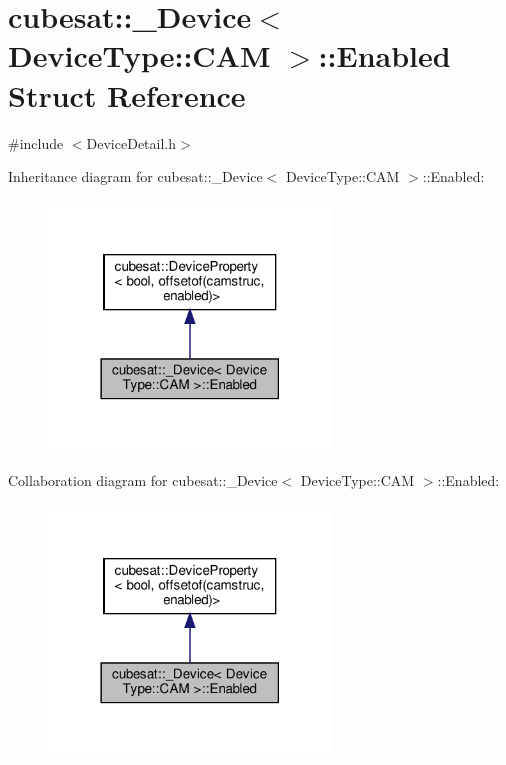 \hypertarget{structcubesat_1_1__Device_3_01DeviceType_1_1CAM_01_4_1_1Enabled}{}\section{cubesat\+:\+:\+\_\+\+Device$<$ Device\+Type\+:\+:C\+AM $>$\+:\+:Enabled Struct Reference}
\label{structcubesat_1_1__Device_3_01DeviceType_1_1CAM_01_4_1_1Enabled}


{\ttfamily \#include $<$Device\+Detail.\+h$>$}



Inheritance diagram for cubesat\+:\+:\+\_\+\+Device$<$ Device\+Type\+:\+:C\+AM $>$\+:\+:Enabled\+:\nopagebreak
\begin{figure}[H]
\begin{center}
\leavevmode
\includegraphics[width=213pt]{structcubesat_1_1__Device_3_01DeviceType_1_1CAM_01_4_1_1Enabled__inherit__graph}
\end{center}
\end{figure}


Collaboration diagram for cubesat\+:\+:\+\_\+\+Device$<$ Device\+Type\+:\+:C\+AM $>$\+:\+:Enabled\+:\nopagebreak
\begin{figure}[H]
\begin{center}
\leavevmode
\includegraphics[width=213pt]{structcubesat_1_1__Device_3_01DeviceType_1_1CAM_01_4_1_1Enabled__coll__graph}
\end{center}
\end{figure}
